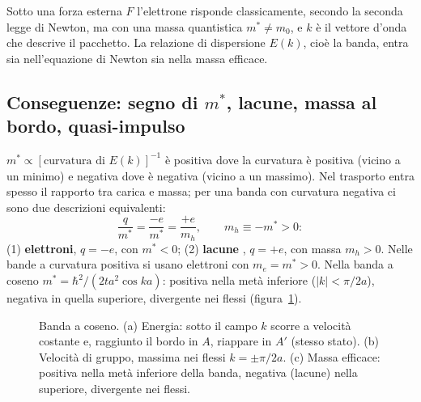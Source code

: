 \documentclass[11pt,a4paper]{article}
\begin{document}
\begin{riepilogo}
Sotto una forza esterna $F$ l'elettrone risponde classicamente, secondo la seconda legge di Newton, ma con una massa quantistica $m^*\ne m_0$, e $k$ è
il vettore d'onda che descrive il pacchetto. La relazione di dispersione $E(k)$, cioè la banda, entra sia nell'equazione di Newton sia nella massa
efficace.
\end{riepilogo}

\subsection{Conseguenze: segno di $m^*$, lacune, massa al bordo, quasi-impulso}\label{sec:semiconseg}
$m^*\propto[\text{curvatura di }E(k)]^{-1}$ è positiva dove la curvatura è positiva (vicino a un minimo) e negativa dove è negativa (vicino a un
massimo). Nel trasporto entra spesso il rapporto tra carica e massa; per una banda con curvatura negativa ci sono due descrizioni equivalenti:
\[
\frac{q}{m^*}=\frac{-e}{m^*}=\frac{+e}{m_h},\qquad m_h\equiv-m^*>0 :
\]
(1) \textbf{elettroni}, $q=-e$, con $m^*<0$; (2) \textbf{lacune} , $q=+e$, con massa $m_h>0$. Nelle bande a curvatura positiva si usano
elettroni con $m_e=m^*>0$. Nella banda a coseno $m^*=\hbar^2/(2ta^2\cos ka)$: positiva nella metà inferiore ($|k|<\pi/2a$), negativa in quella
superiore, divergente nei flessi (figura~\ref{fig:semicl}).

\begin{figure}[tbp]
\centering
{}
\caption{Banda a coseno. (a) Energia: sotto il campo $k$ scorre a velocità costante e, raggiunto il bordo in $A$, riappare in $A'$ (stesso stato).
(b) Velocità di gruppo, massima nei flessi $k=\pm\pi/2a$. (c) Massa efficace: positiva nella metà inferiore della banda, negativa (lacune) nella
superiore, divergente nei flessi.}\label{fig:semicl}
\end{figure}
\end{document}
